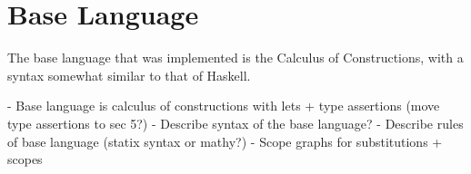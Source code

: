 \section{Base Language}

The base language that was implemented is the Calculus of Constructions, with a syntax somewhat similar to that of Haskell.

- Base language is calculus of constructions with lets + type assertions (move type assertions to sec 5?)
- Describe syntax of the base language?
- Describe rules of base language (statix syntax or mathy?)
- Scope graphs for substitutions + scopes